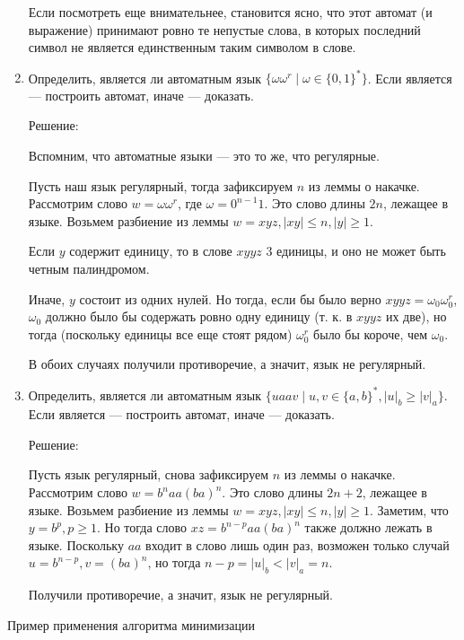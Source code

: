 \documentclass[12pt]{article}
\begin{document}
\begin{enumerate}
    Если посмотреть еще внимательнее, становится ясно, что этот автомат (и выражение)
    принимают ровно те непустые слова, в которых последний символ не является
    единственным таким символом в слове.
  \item Определить, является ли автоматным язык $\{ \omega \omega^r \mid \omega \in \{ 0, 1 \}^* \}$. Если является --- построить автомат, иначе --- доказать.

    Решение:

    Вспомним, что автоматные языки --- это то же, что регулярные.

    Пусть наш язык регулярный, тогда зафиксируем $n$ из леммы о накачке.
    Рассмотрим слово $w = \omega \omega^r$, где $\omega = 0^{n-1}1$.
    Это слово длины $2n$, лежащее в языке.
    Возьмем разбиение из леммы $w = xyz, |xy| \le n, |y| \ge 1$.

    Если $y$ содержит единицу, то в слове $xyyz$ 3 единицы, и оно не может
    быть четным палиндромом.

    Иначе, $y$ состоит из одних нулей. Но тогда, если бы было верно
    $xyyz = \omega_0 \omega_0^r$, $\omega_0$ должно было бы содержать ровно одну
    единицу (т. к. в $xyyz$ их две), но тогда (поскольку единицы все еще стоят рядом)
    $\omega_0^r$ было бы короче, чем $\omega_0$.

    В обоих случаях получили противоречие, а значит, язык не регулярный.
  \item Определить, является ли автоматным язык $\{ u a a v \mid u, v \in \{ a, b \}^* , |u|_b \geq |v|_a \}$. Если является --- построить автомат, иначе --- доказать.

    Решение:

    Пусть язык регулярный, снова зафиксируем $n$ из леммы о накачке. Рассмотрим слово
    $w = b^n aa {(ba)}^n$. Это слово длины $2n + 2$, лежащее в языке. Возьмем разбиение из
    леммы $w = xyz, |xy| \le n, |y| \ge 1$. Заметим, что $y = b^p, p \ge 1$.
    Но тогда слово $xz = b^{n-p} aa {(ba)}^n$ также должно лежать в языке.
    Поскольку $aa$ входит в слово лишь один раз, возможен только случай
    $u = b^{n-p}, v = {(ba)}^n$, но тогда $n - p = |u|_b < |v|_a = n$.

    Получили противоречие, а значит, язык не регулярный.
\end{enumerate}

\newpage

\begin{center}
  \Large{Пример применения алгоритма минимизации}
\end{center}
\end{document}
